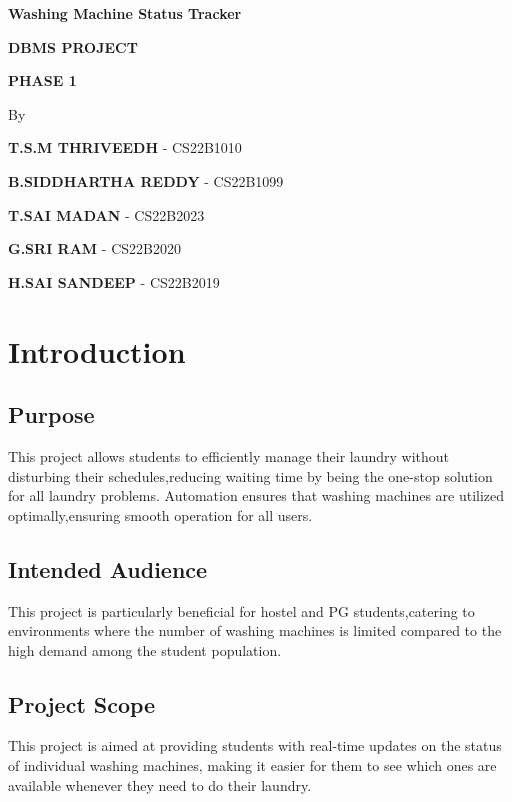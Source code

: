 \documentclass{article}
\begin{document}
\begin{center}
\large\bfseries{Washing Machine Status Tracker}
\end{center}
\begin{center}
\vspace*{1.2cm}
\noindent \textbf{DBMS PROJECT}

\noindent \textbf{PHASE 1}
\vspace*{1.2cm}

\noindent By

\noindent \textbf{T.S.M THRIVEEDH} - CS22B1010

\noindent \textbf{B.SIDDHARTHA REDDY} - CS22B1099

\noindent \textbf{T.SAI MADAN} - CS22B2023

\noindent \textbf{G.SRI RAM} - CS22B2020

\noindent \textbf{H.SAI SANDEEP} - CS22B2019

\end{center}
\begin{figure}[h]
\begin{center}
\end{center}
\end{figure}
\newpage
\tableofcontents
\newpage

\section{Introduction}
\subsection{Purpose}
This project allows students to efficiently manage their laundry without disturbing their schedules,reducing waiting time by being the one-stop solution for all laundry problems.
Automation ensures that washing machines are utilized optimally,ensuring smooth operation for all users.
\subsection{Intended Audience}
This project is particularly beneficial for hostel and PG students,catering to environments where the number of washing machines is limited compared to the high demand among the student population.
\subsection{Project Scope}
This project is aimed at providing students with real-time updates on the status of individual washing machines, making it easier for them to see which ones are available whenever they need to do their laundry. 
\end{document}
